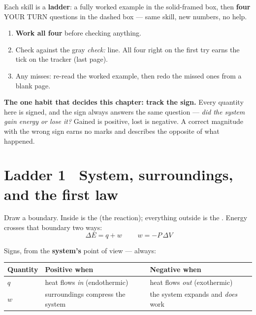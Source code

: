 \documentclass{apchem-worksheet}
\begin{document}
\apctitleblock

\begin{apcnote}
Each skill is a \textbf{ladder}: a fully worked example in the
solid-framed box, then \textbf{four} YOUR TURN questions in the dashed
box --- same skill, new numbers, no help.

\begin{enumerate}[leftmargin=*,itemsep=0.15em]
  \item \textbf{Work all four} before checking anything.
  \item Check against the gray \emph{check:} line. All four right on the
        first try earns the tick on the tracker (last page).
  \item Any misses: re-read the worked example, then redo the missed ones
        from a blank page.
\end{enumerate}

\textbf{The one habit that decides this chapter: track the sign.} Every
quantity here is signed, and the sign always answers the same question
--- \emph{did the system gain energy or lose it?} Gained is positive,
lost is negative. A correct magnitude with the wrong sign earns no marks
and describes the opposite of what happened.
\end{apcnote}

\section*{\sffamily Ladder 1 \textbullet\ System, surroundings, and the
first law}

Draw a boundary. Inside is the  (the reaction); everything
outside is the . Energy crosses that boundary two
ways:
\[ \boxed{\;\Delta E = q + w\;} \qquad w = -P\,\Delta V \]

Signs, from the \textbf{system's} point of view --- always:

\begin{center}
\renewcommand{\arraystretch}{1.2}
\begin{tabular}{@{}lll@{}}
\hline
\textbf{Quantity} & \textbf{Positive when} & \textbf{Negative when} \\
\hline
$q$ & heat flows \emph{in} (endothermic) & heat flows \emph{out}
  (exothermic) \\
$w$ & surroundings compress the system & the system expands and
  \emph{does} work \\
\hline
\end{tabular}
\end{center}
\end{document}
